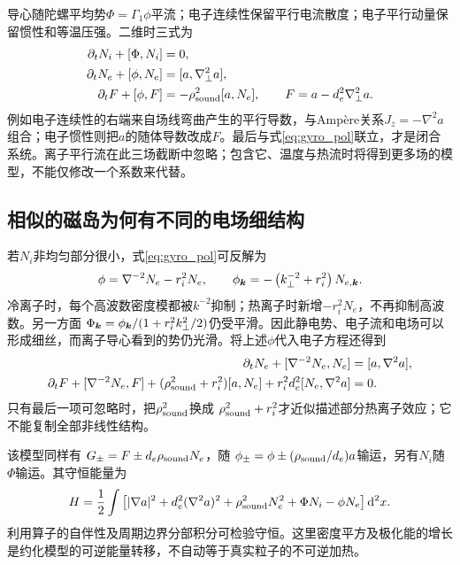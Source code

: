 \documentclass[UTF8,a4paper,11pt,openany,fontset=fandol]{ctexbook}
\begin{document}
导心随陀螺平均势$\Phi=\Gamma_1\phi$平流；电子连续性保留平行电流散度；电子平行动量保留惯性和等温压强。二维时三式为
\begin{align}
 \partial_tN_i+[\Phi,N_i]&=0,\\
 \partial_tN_e+[\phi,N_e]&=[a,\nabla_\perp^2a],\\
 \partial_tF+[\phi,F]&=-\rho_{\rm sound}^2[a,N_e],
 \qquad F=a-d_e^2\nabla_\perp^2a.
\end{align}
例如电子连续性的右端来自场线弯曲产生的平行导数，与Ampère关系$J_z=-\nabla^2a$组合；电子惯性则把$a$的随体导数改成$F$。最后与式\eqref{eq:gyro_pol}联立，才是闭合系统。离子平行流在此三场截断中忽略；包含它、温度与热流时将得到更多场的模型，不能仅修改一个系数来代替。

\subsection{相似的磁岛为何有不同的电场细结构}
若$N_i$非均匀部分很小，式\eqref{eq:gyro_pol}可反解为
\begin{equation}
 \phi=\nabla^{-2}N_e-r_i^2N_e,
 \qquad \phi_{\bm{k}}=-\left(k_\perp^{-2}+r_i^2\right)N_{e,\bm{k}}.
\end{equation}
冷离子时，每个高波数密度模都被$k^{-2}$抑制；热离子时新增$-r_i^2N_e$，不再抑制高波数。另一方面
$\Phi_{\bm{k}}=\phi_{\bm{k}}/(1+r_i^2k_\perp^2/2)$仍受平滑。因此静电势、电子流和电场可以形成细丝，而离子导心看到的势仍光滑。将上述$\phi$代入电子方程还得到
\begin{align}
 \partial_tN_e+[\nabla^{-2}N_e,N_e]&=[a,\nabla^2a],\\
 \partial_tF+[\nabla^{-2}N_e,F]
 +(\rho_{\rm sound}^2+r_i^2)[a,N_e]
 +r_i^2d_e^2[N_e,\nabla^2a]&=0.
\end{align}
只有最后一项可忽略时，把$\rho_{\rm sound}^2$换成
$\rho_{\rm sound}^2+r_i^2$才近似描述部分热离子效应；它不能复制全部非线性结构。

该模型同样有
$G_\pm=F\pm d_e\rho_{\rm sound}N_e$，随
$\phi_\pm=\phi\pm(\rho_{\rm sound}/d_e)a$输运，另有$N_i$随$\Phi$输运。其守恒能量为
\begin{equation}
 H=\frac12\int\left[|\nabla a|^2+d_e^2(\nabla^2a)^2
 +\rho_{\rm sound}^2N_e^2+\Phi N_i-\phi N_e\right]\mathrm d^2x.
\end{equation}
利用算子的自伴性及周期边界分部积分可检验守恒。这里密度平方及极化能的增长是约化模型的可逆能量转移，不自动等于真实粒子的不可逆加热。\citep{E469}
\end{document}
